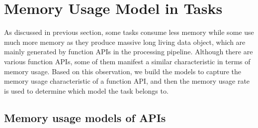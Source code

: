 \section{Memory Usage Model in Tasks}



As discussed in previous section, some tasks consume less memory while some use much more memory as they produce massive long living data object, which are mainly generated by function APIs in the processing pipeline. Although there are various function APIs, some of them manifest a similar characteristic in terms of memory usage. Based on this observation, we build the models to capture the memory usage characteristic of a function API, and then the memory usage rate is used to determine which model the task belongs to.


\subsection{Memory usage models of APIs}

